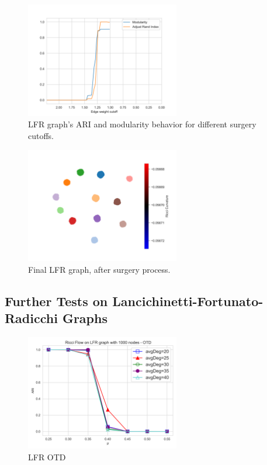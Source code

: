\begin{figure}
    \centering
    \includegraphics[width=0.6\textwidth]{../tests/ToyModelResults/LFR/Surgery Accuracy.png}
    \caption{LFR graph's ARI and modularity behavior for different surgery cutoffs.}
\end{figure}\label{fig:LFR_Accuracy}

\begin{figure}
    \centering
    \includegraphics[width=0.6\textwidth]{../tests/ToyModelResults/LFR/After Surgery.png}
        \caption{Final LFR graph, after surgery process.}
\end{figure}\label{fig:LFR_Surgery}

\subsection{Further Tests on Lancichinetti-Fortunato-Radicchi Graphs}

\begin{figure}
    \centering
    \includegraphics[width=0.6\textwidth]{../tests/LFRResults/LFR_OTD.png}
    \caption{LFR OTD}
\end{figure}\label{fig:LFR_OTD}

